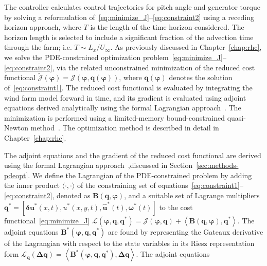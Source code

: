 The controller calculates control trajectories for pitch angle and generator torque by solving a reformulation of~\eqref{eq:minimize_J}--\eqref{eq:constraint2} using a receding horizon approach, where $T$ is the length of the time horizon considered. The horizon length is selected to include a significant fraction of the advection time through the farm; i.e. $T \sim L_x/U_\infty$. As previously discussed in Chapter~\ref{chap:rhc}, we solve the PDE-constrained optimization problem~\eqref{eq:minimize_J}--\eqref{eq:constraint2}, via the related unconstrained minimization of the reduced cost functional $\tilde{\mathcal{J}}(\boldsymbol \varphi) = \mathcal{J}(\boldsymbol \varphi, \mathbf{q}(\boldsymbol \varphi))$, where $\mathbf{q}(\boldsymbol \varphi)$ denotes the solution of~\eqref{eq:constraint1}. The reduced cost functional is evaluated by integrating the wind farm model forward in time, and its gradient is evaluated using adjoint equations derived analytically using the formal Lagrangian approach~\cite{Borzi2011a}.  The minimization is performed using a limited-memory bound-constrained quasi-Newton method~\cite{Zhu1997a}. The optimization method is described in detail in Chapter~\ref{chap:rhc}.

The adjoint equations and the gradient of the reduced cost functional are derived using the formal Lagrangian approach~\cite{Borzi2011a},discussed in Section~\ref{sec:methods-pdeopt}. We define the Lagrangian of the PDE-constrained problem by adding the inner product $\langle \cdot, \cdot \rangle$ of the constraining set of equations~\eqref{eq:constraint1}--\eqref{eq:constraint2}, denoted as $\mathbf{B}(\mathbf{q}, \boldsymbol \varphi)$, and a suitable set of Lagrange multipliers \mbox{$\mathbf{q}^* = \left[  \boldsymbol \delta \mathbf{u}^*(x,t), u^*(x,y,t), \mathbf{\hat{u}}^*(t), \boldsymbol \omega^*(t)\right]$} to the cost functional~\eqref{eq:minimize_J} $
\mathcal{L}(\boldsymbol \varphi, \mathbf{q}, \mathbf{q}^*) = \mathcal{J}(\boldsymbol \varphi, \mathbf{q}) + \left\langle \mathbf{B}(\mathbf{q}, \boldsymbol \varphi), \mathbf{q}^*  \right\rangle.$
The adjoint equations $\mathbf{B}^*(\boldsymbol \varphi, \mathbf{q},\mathbf{q}^*)$ are found by representing the Gateaux derivative of the Lagrangian with respect to the state variables in its Riesz representation form \mbox{$\mathcal{L}_\mathbf{q}(\boldsymbol \Delta \mathbf{q}) = \left \langle  \mathbf{B}^*(\boldsymbol \varphi, \mathbf{q},\mathbf{q}^*), \boldsymbol \Delta \mathbf{q} \right\rangle$}. The adjoint equations

